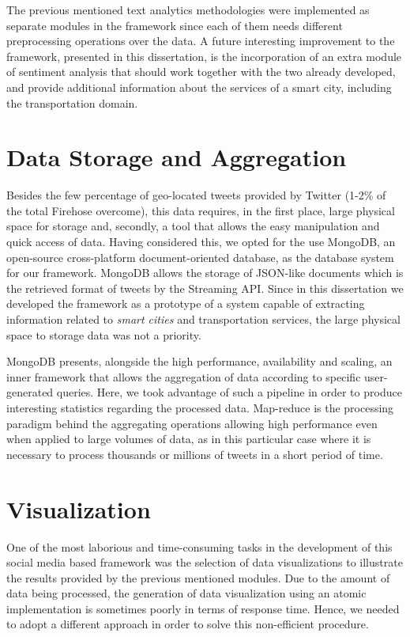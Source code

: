 \medskip

The previous mentioned text analytics methodologies were implemented as separate modules in the framework since each of them needs different preprocessing operations over the data. A future interesting improvement to the framework, presented in this dissertation, is the incorporation of an extra module of sentiment analysis that should work together with the two already developed, and provide additional information about the services of a smart city, including the transportation domain.

\section{Data Storage and Aggregation}\label{sec:storage_aggregations}

Besides the few percentage of geo-located tweets provided by Twitter (1-2\% of the total Firehose overcome), this data requires, in the first place, large physical space for storage and, secondly, a tool that allows the easy manipulation and quick access of data. Having considered this, we opted for the use MongoDB, an open-source cross-platform document-oriented database, as the database system for our framework. MongoDB allows the storage of JSON-like documents which is the retrieved format of tweets by the Streaming API. Since in this dissertation we developed the framework as a prototype of a system capable of extracting information related to \textit{smart cities} and transportation services, the large physical space to storage data was not a priority.

MongoDB presents, alongside the high performance, availability and scaling, an inner framework that allows the aggregation of data according to specific user-generated queries. Here, we took advantage of such a pipeline in order to produce interesting statistics regarding the processed data. Map-reduce is the processing paradigm behind the aggregating operations allowing high performance even when applied to large volumes of data, as in this particular case where it is necessary to process thousands or millions of tweets in a short period of time.

\section{Visualization}\label{sec:visualization}

One of the most laborious and time-consuming tasks in the development of this social media based framework was the selection of data visualizations to illustrate the results provided by the previous mentioned modules. Due to the amount of data being processed, the generation of data visualization using an atomic implementation is sometimes poorly in terms of response time. Hence, we needed to adopt a different approach in order to solve this non-efficient procedure.

